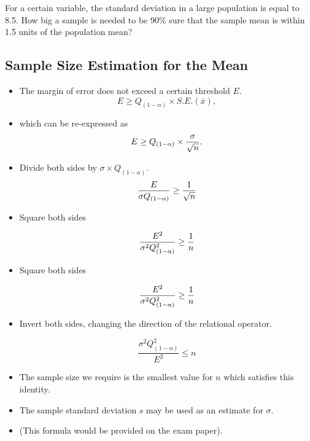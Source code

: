 \documentclass[]{report}
\begin{document}
For a certain variable, the standard deviation in a large population is equal to 8.5.
How big a sample is needed to be 90\% sure that the sample mean is within 1.5
units of the population mean?


\subsection{Sample Size Estimation for the Mean}

\begin{multicols}{2}

\begin{itemize}

\item The margin of error does not exceed a certain threshold $E$.
\[ E \geq Q_{(1-\alpha)} \times S.E.(\bar{x}), \]

\item which can be re-expressed as
\[E \geq Q_{(1-\alpha)} \times {\sigma \over \sqrt{n} }.\]

\item Divide both sides by $\sigma \times Q_{(1-\alpha)}$.
\[ \frac{E}{\sigma Q_{(1-\alpha)}} \geq {1 \over \sqrt{n} } \]

\item Square both sides

\[ \frac{E^2}{\sigma^2 Q_{(1-\alpha)}^2} \geq {1 \over n } \]



\item Square both sides

\[ \frac{E^2}{\sigma^2 Q^2_{(1-\alpha)}} \geq {1 \over n } \]


\item Invert both sides, changing the direction of the relational operator.

\[ \frac{\sigma^2 Q^2_{(1-\alpha)}}{E^2} \leq n \]
\end{itemize}

\end{multicols}
\begin{itemize}
\item The sample size we require is the smallest value for $n$ which satisfies this identity.
\item The sample standard deviation $s$ may be used as an estimate for $\sigma$.
\item (This formula would be provided on the exam paper).
\end{itemize}
\end{document}
